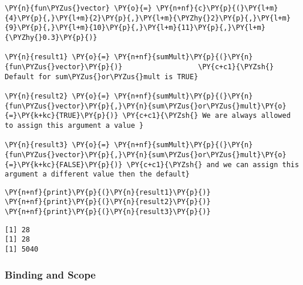     \begin{tcolorbox}[breakable, size=fbox, boxrule=1pt, pad at break*=1mm,colback=cellbackground, colframe=cellborder]
\begin{Verbatim}[commandchars=\\\{\}]
\PY{n}{fun\PYZus{}vector} \PY{o}{=} \PY{n+nf}{c}\PY{p}{(}\PY{l+m}{4}\PY{p}{,}\PY{l+m}{2}\PY{p}{,}\PY{l+m}{\PYZhy{}2}\PY{p}{,}\PY{l+m}{9}\PY{p}{,}\PY{l+m}{10}\PY{p}{,}\PY{l+m}{11}\PY{p}{,}\PY{l+m}{\PYZhy{}0.3}\PY{p}{)}

\PY{n}{result1} \PY{o}{=} \PY{n+nf}{sumMult}\PY{p}{(}\PY{n}{fun\PYZus{}vector}\PY{p}{)}                  \PY{c+c1}{\PYZsh{} Default for sum\PYZus{}or\PYZus{}mult is TRUE}

\PY{n}{result2} \PY{o}{=} \PY{n+nf}{sumMult}\PY{p}{(}\PY{n}{fun\PYZus{}vector}\PY{p}{,}\PY{n}{sum\PYZus{}or\PYZus{}mult}\PY{o}{=}\PY{k+kc}{TRUE}\PY{p}{)} \PY{c+c1}{\PYZsh{} We are always allowed to assign this argument a value }

\PY{n}{result3} \PY{o}{=} \PY{n+nf}{sumMult}\PY{p}{(}\PY{n}{fun\PYZus{}vector}\PY{p}{,}\PY{n}{sum\PYZus{}or\PYZus{}mult}\PY{o}{=}\PY{k+kc}{FALSE}\PY{p}{)} \PY{c+c1}{\PYZsh{} and we can assign this argument a different value then the default}
\end{Verbatim}
\end{tcolorbox}

    \begin{tcolorbox}[breakable, size=fbox, boxrule=1pt, pad at break*=1mm,colback=cellbackground, colframe=cellborder]
\begin{Verbatim}[commandchars=\\\{\}]
\PY{n+nf}{print}\PY{p}{(}\PY{n}{result1}\PY{p}{)}
\PY{n+nf}{print}\PY{p}{(}\PY{n}{result2}\PY{p}{)}
\PY{n+nf}{print}\PY{p}{(}\PY{n}{result3}\PY{p}{)}
\end{Verbatim}
\end{tcolorbox}

    \begin{Verbatim}[commandchars=\\\{\}]
[1] 28
[1] 28
[1] 5040
    \end{Verbatim}

    \hypertarget{binding-and-scope}{%
\subsubsection{Binding and Scope}\label{binding-and-scope}}

